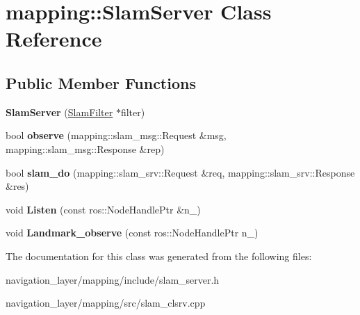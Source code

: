 \hypertarget{classmapping_1_1SlamServer}{}\section{mapping\+:\+:Slam\+Server Class Reference}
\label{classmapping_1_1SlamServer}
\subsection*{Public Member Functions}
\begin{DoxyCompactItemize}
\item 
\mbox{\label{classmapping_1_1SlamServer_acdb406370c234a7822a0178f7e7199cc}} 
{\bfseries Slam\+Server} (\hyperlink{classmapping_1_1SlamFilter}{Slam\+Filter} $\ast$filter)
\item 
\mbox{\label{classmapping_1_1SlamServer_aa9f639df8df86e7fab42b2f2d09faca6}} 
bool {\bfseries observe} (mapping\+::slam\+\_\+msg\+::\+Request \&msg, mapping\+::slam\+\_\+msg\+::\+Response \&rep)
\item 
\mbox{\label{classmapping_1_1SlamServer_aa25ecf8b89e03e5c3eb1d3a68b7c6f6e}} 
bool {\bfseries slam\+\_\+do} (mapping\+::slam\+\_\+srv\+::\+Request \&req, mapping\+::slam\+\_\+srv\+::\+Response \&res)
\item 
\mbox{\label{classmapping_1_1SlamServer_a20e8c59c6e0f2120108447fd462968cd}} 
void {\bfseries Listen} (const ros\+::\+Node\+Handle\+Ptr \&n\+\_\+)
\item 
\mbox{\label{classmapping_1_1SlamServer_ad40f0403aad31ce7fedaa24fbbc235cf}} 
void {\bfseries Landmark\+\_\+observe} (const ros\+::\+Node\+Handle\+Ptr n\+\_\+)
\end{DoxyCompactItemize}


The documentation for this class was generated from the following files\+:\begin{DoxyCompactItemize}
\item 
navigation\+\_\+layer/mapping/include/slam\+\_\+server.\+h\item 
navigation\+\_\+layer/mapping/src/slam\+\_\+clsrv.\+cpp\end{DoxyCompactItemize}
